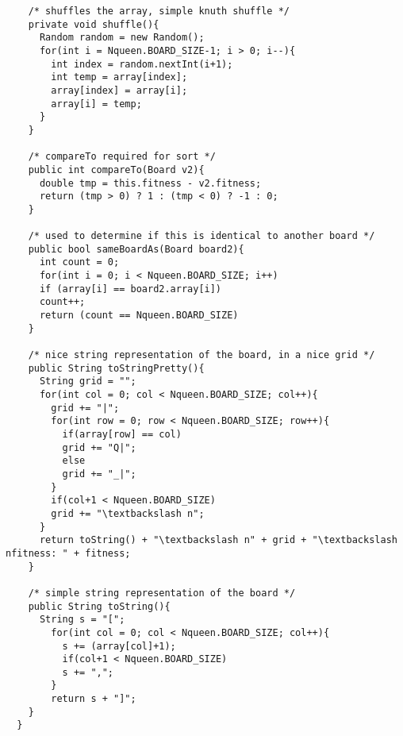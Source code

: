 \documentclass[a4paper,11pt]{article}
\begin{document}
\begin{lstlisting}
    /* shuffles the array, simple knuth shuffle */
    private void shuffle(){
      Random random = new Random();
      for(int i = Nqueen.BOARD_SIZE-1; i > 0; i--){
        int index = random.nextInt(i+1);
        int temp = array[index];
        array[index] = array[i];
        array[i] = temp;
      }
    }

    /* compareTo required for sort */
    public int compareTo(Board v2){
      double tmp = this.fitness - v2.fitness;
      return (tmp > 0) ? 1 : (tmp < 0) ? -1 : 0;
    }

    /* used to determine if this is identical to another board */
    public bool sameBoardAs(Board board2){
      int count = 0;
      for(int i = 0; i < Nqueen.BOARD_SIZE; i++)
      if (array[i] == board2.array[i])
      count++;
      return (count == Nqueen.BOARD_SIZE)
    }

    /* nice string representation of the board, in a nice grid */
    public String toStringPretty(){
      String grid = "";
      for(int col = 0; col < Nqueen.BOARD_SIZE; col++){
        grid += "|";
        for(int row = 0; row < Nqueen.BOARD_SIZE; row++){
          if(array[row] == col)
          grid += "Q|";
          else
          grid += "_|";
        }
        if(col+1 < Nqueen.BOARD_SIZE)
        grid += "\textbackslash n";
      }
      return toString() + "\textbackslash n" + grid + "\textbackslash nfitness: " + fitness;
    }

    /* simple string representation of the board */
    public String toString(){
      String s = "[";
        for(int col = 0; col < Nqueen.BOARD_SIZE; col++){
          s += (array[col]+1);
          if(col+1 < Nqueen.BOARD_SIZE)
          s += ",";
        }
        return s + "]";
    }
  }
\end{lstlisting}
\end{document}
